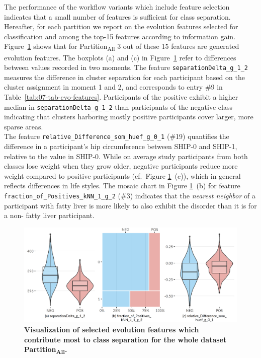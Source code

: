 \documentclass[
  oneside]{book}
\begin{document}
The performance of the workflow variants which include feature selection indicates that a small number of features is sufficient for class separation.
Hereafter, for each partition we report on the evolution features selected for classification and among the top-15 features according to information gain.
Figure~\ref{fig:07-imp-features-all} shows that for Partition\textsubscript{All} 3 out of these 15 features are generated evolution features.
The boxplots (a) and (c) in Figure~\ref{fig:07-imp-features-all} refer to differences between values recorded in two moments.
The feature \texttt{separationDelta\_g\_1\_2} measures the difference in cluster separation for each participant based on the cluster assignment in moment 1 and 2, and corresponds to entry \#9 in Table~\ref{tab:07-tab-evo-features}.
Participants of the positive exhibit a higher median in \texttt{separationDelta\_g\_1\_2} than participants of the negative class indicating that clusters harboring mostly positive participants cover larger, more sparse areas.\\
The feature \texttt{relative\_Difference\_som\_huef\_g\_0\_1} (\#19) quantifies the difference in a participant's hip circumference between SHIP-0 and SHIP-1, relative to the value in SHIP-0.
While on average study participants from both classes lose weight when they grow older, negative participants reduce more weight compared to positive participants (cf.~Figure \ref{fig:07-imp-features-all}~(c)), which in general reflects differences in life styles.
The mosaic chart in Figure \ref{fig:07-imp-features-all}~(b) for feature \texttt{fraction\_of\_Positives\_kNN\_1\_g\_2} (\#3) indicates that the \emph{nearest neighbor} of a participant with fatty liver is more likely to also exhibit the disorder than it is for a non- fatty liver participant.



\begin{figure}[h]

{\centering \includegraphics[width=0.75\linewidth]{figures/07-imp-features-all} 

}

\caption{\textbf{Visualization of selected evolution features which contribute most to class separation for the whole dataset Partition\textsubscript{All}.}}\label{fig:07-imp-features-all}
\end{figure}
\end{document}

